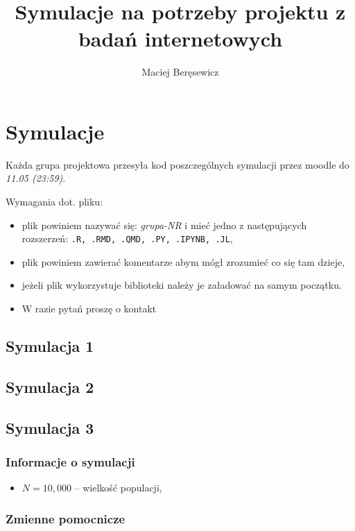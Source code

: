 \documentclass[
]{article}
\title{Symulacje na potrzeby projektu z badań internetowych}
\author{Maciej Beręsewicz}
\date{}
\providecommand{\tightlist}{%
  \setlength{\itemsep}{0pt}\setlength{\parskip}{0pt}}
\begin{document}
\maketitle

\section{Symulacje}\label{symulacje}

Każda grupa projektowa przesyła kod poszczególnych symulacji przez
moodle do \emph{11.05 (23:59)}.

Wymagania dot. pliku:

\begin{itemize}
\tightlist
\item
  plik powiniem nazywać się: \emph{grupa-NR} i mieć jedno z
  następujących rozszerzeń:
  \texttt{.R,\ .RMD,\ .QMD,\ .PY,\ .IPYNB,\ .JL},
\item
  plik powiniem zawierać komentarze abym mógł zrozumieć co się tam
  dzieje,
\item
  jeżeli plik wykorzystuje biblioteki należy je załadować na samym
  początku.
\item
  W razie pytań proszę o kontakt
\end{itemize}

\subsection{Symulacja 1}\label{symulacja-1}

\subsection{Symulacja 2}\label{symulacja-2}

\subsection{Symulacja 3}\label{symulacja-3}

\subsubsection{Informacje o symulacji}\label{informacje-o-symulacji}

\begin{itemize}
\tightlist
\item
  \(N=10,000\) -- wielkość populacji,
\end{itemize}

\subsubsection{Zmienne pomocnicze}\label{zmienne-pomocnicze}
\end{document}
